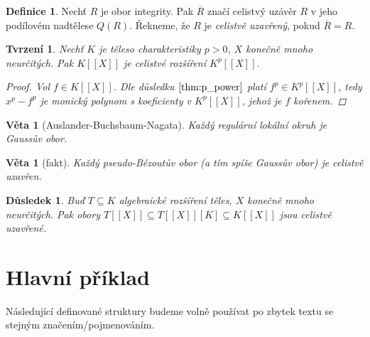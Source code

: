 \documentclass[11pt,a4paper]{article}
\let \icl \overline %
\newcounter{numb}
\theoremstyle{definition}
\newtheorem*{definice}{Definice}
\theoremstyle{plain}
\newtheorem{veta}[numb]{Věta}
\newtheorem{tvrzeni}[numb]{Tvrzení}
\newtheorem{dusledek}[numb]{Důsledek}
\begin{document}
\begin{definice}
	Nechť $R$ je obor integrity. Pak $\icl{R}$ značí celistvý uzávěr $R$ v jeho podílovém nadtělese $Q(R)$. Řekneme, že $R$ je \emph{celistvě uzavřený}, pokud $\icl{R} = R$.
\end{definice}

\begin{tvrzeni}	\label{thm:KX_integral}
	Nechť $K$ je těleso charakteristiky $p > 0$, $X$ konečně mnoho neurčitých. Pak $K[[X]]$ je celistvé rozšíření $K^p[[X]]$.

	\begin{proof}
		Vol $f \in K[[X]]$. Dle důsledku $\ref{thm:p_power}$ platí $f^p \in K^p[[X]]$, tedy $x^p - f^p$ je monický polynom s koeficienty v $K^p[[X]]$, jehož je $f$ kořenem.
	\end{proof}
\end{tvrzeni}

\begin{veta}[Auslander-Buchsbaum-Nagata]
	Každý regulární lokální okruh je Gaussův obor.
\end{veta}

\begin{veta}[fakt]
	Každý pseudo-Bézoutův obor (a tím spíše Gaussův obor) je celistvě uzavřen.
\end{veta}

\begin{dusledek} \label{thm:icl}
	Buď $T \subseteq K$ algebraické rozšíření těles, $X$ konečně mnoho neurčitých. Pak obory $T[[X]] \subseteq T[[X]][K] \subseteq K[[X]]$ jsou celistvě uzavřené.
\end{dusledek}


\section{Hlavní příklad}

Následující definované struktury budeme volně používat po zbytek textu se stejným značením/pojmenováním.
\end{document}
